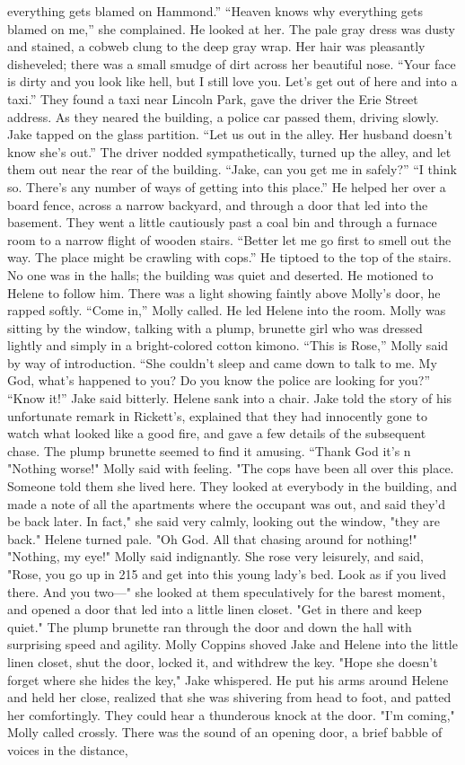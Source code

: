 \documentclass{novel}
\begin{document}
everything gets blamed on Hammond.” “Heaven knows why everything gets blamed on me,” she complained. He looked at her. The pale gray dress was dusty and stained, a cobweb clung to the deep gray wrap. Her hair was pleasantly disheveled; there was a small smudge of dirt across her beautiful nose. “Your face is dirty and you look like hell, but I still love you. Let’s get out of here and into a taxi.” They found a taxi near Lincoln Park, gave the driver the Erie Street address. As they neared the building, a police car passed them, driving slowly. Jake tapped on the glass partition. “Let us out in the alley. Her husband doesn’t know she’s out.” The driver nodded sympathetically, turned up the alley, and let them out near the rear of the building. “Jake, can you get me in safely?” “I think so. There’s any number of ways of getting into this place.” He helped her over a board fence, across a narrow backyard, and through a door that led into the basement. They went a little cautiously past a coal bin and through a furnace room to a narrow flight of wooden stairs. “Better let me go first to smell out the way. The place might be crawling with cops.” He tiptoed to the top of the stairs. No one was in the halls; the building was quiet and deserted. He motioned to Helene to follow him. There was a light showing faintly above Molly’s door, he rapped softly. “Come in,” Molly called. He led Helene into the room. Molly was sitting by the window, talking with a plump, brunette girl who was dressed lightly and simply in a bright-colored cotton kimono. “This is Rose,” Molly said by way of introduction. “She couldn’t sleep and came down to talk to me. My God, what’s happened to you? Do you know the police are looking for you?” “Know it!” Jake said bitterly. Helene sank into a chair. Jake told the story of his unfortunate remark in Rickett’s, explained that they had innocently gone to watch what looked like a good fire, and gave a few details of the subsequent chase. The plump brunette seemed to find it amusing. “Thank God it’s n "Nothing worse!" Molly said with feeling. "The cops have been all over this place. Someone told them she lived here. They looked at everybody in the building, and made a note of all the apartments where the occupant was out, and said they’d be back later. In fact," she said very calmly, looking out the window, "they are back." Helene turned pale. "Oh God. All that chasing around for nothing!" "Nothing, my eye!" Molly said indignantly. She rose very leisurely, and said, "Rose, you go up in 215 and get into this young lady’s bed. Look as if you lived there. And you two—" she looked at them speculatively for the barest moment, and opened a door that led into a little linen closet. "Get in there and keep quiet." The plump brunette ran through the door and down the hall with surprising speed and agility. Molly Coppins shoved Jake and Helene into the little linen closet, shut the door, locked it, and withdrew the key. "Hope she doesn’t forget where she hides the key," Jake whispered. He put his arms around Helene and held her close, realized that she was shivering from head to foot, and patted her comfortingly. They could hear a thunderous knock at the door. "I’m coming," Molly called crossly. There was the sound of an opening door, a brief babble of voices in the distance, 
\end{document}
